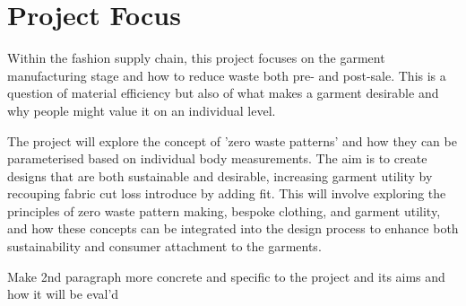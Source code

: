\section{Project Focus}
Within the fashion supply chain, this project focuses on the garment manufacturing stage and how to reduce waste both pre- and post-sale. This is a question of material efficiency but also of what makes a garment desirable and why people might value it on an individual level. 

The project will explore the concept of 'zero waste patterns' and how they can be parameterised based on individual body measurements. The aim is to create designs that are both sustainable and desirable, increasing garment utility by recouping fabric cut loss introduce by adding fit. This will involve exploring the principles of zero waste pattern making, bespoke clothing, and garment utility, and how these concepts can be integrated into the design process to enhance both sustainability and consumer attachment to the garments.

Make 2nd paragraph more concrete and specific to the project and its aims and how it will be eval'd

